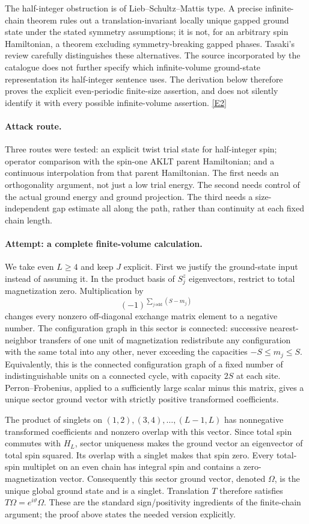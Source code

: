 \documentclass[11pt,a4paper]{article}
\newcommand{\eref}[2]{\hyperlink{extra:#1:#2}{[E#2]}}
\numberwithin{equation}{section}
\begin{document}
The half-integer obstruction is of Lieb--Schultz--Mattis type. A precise
infinite-chain theorem rules out a translation-invariant locally unique
gapped ground state under the stated symmetry assumptions; it is not, for
an arbitrary spin Hamiltonian, a theorem excluding symmetry-breaking
gapped phases. Tasaki's review carefully distinguishes these alternatives.
The source incorporated by the catalogue does not further specify which
infinite-volume ground-state representation its half-integer sentence uses.
The derivation below therefore proves the explicit even-periodic
finite-size assertion, and does not silently identify it with every possible
infinite-volume assertion. \eref{111}{2}

\paragraph{Attack route.}
Three routes were tested: an explicit twist trial state for half-integer
spin; operator comparison with the spin-one AKLT parent Hamiltonian; and a
continuous interpolation from that parent Hamiltonian. The first needs an
orthogonality argument, not just a low trial energy. The second needs control
of the actual ground energy and ground projection. The third needs a
size-independent gap estimate all along the path, rather than continuity
at each fixed chain length.

\paragraph{Attempt: a complete finite-volume calculation.}
We take even $L\geq4$ and keep $J$ explicit. First we justify the ground-state
input instead of assuming it. In the product basis of $S_j^z$ eigenvectors,
restrict to total magnetization zero. Multiplication by
\[
 (-1)^{\sum_{j\ \mathrm{odd}}(S-m_j)}
\]
changes every nonzero off-diagonal exchange matrix element to a negative
number. The configuration graph in this sector is connected: successive
nearest-neighbor transfers of one unit of magnetization redistribute any
configuration with the same total into any other, never exceeding the
capacities $-S\leq m_j\leq S$. Equivalently, this is the connected configuration
graph of a fixed number of indistinguishable units on a connected cycle,
with capacity $2S$ at each site. Perron--Frobenius, applied to a sufficiently
large scalar minus this matrix, gives a unique sector ground vector with
strictly positive transformed coefficients.

The product of singlets on $(1,2),(3,4),\ldots,(L-1,L)$ has nonnegative
transformed coefficients and nonzero overlap with this vector. Since total
spin commutes with $H_L$, sector uniqueness makes the ground vector an
eigenvector of total spin squared. Its overlap with a singlet makes that
spin zero. Every total-spin multiplet on an even chain has integral spin
and contains a zero-magnetization vector. Consequently this sector ground
vector, denoted $\Omega$, is the unique global ground state and is a
singlet. Translation $T$ therefore satisfies $T\Omega=e^{i\vartheta}\Omega$.
These are the standard sign/positivity ingredients of the finite-chain
argument; the proof above states the needed version explicitly.
\end{document}
